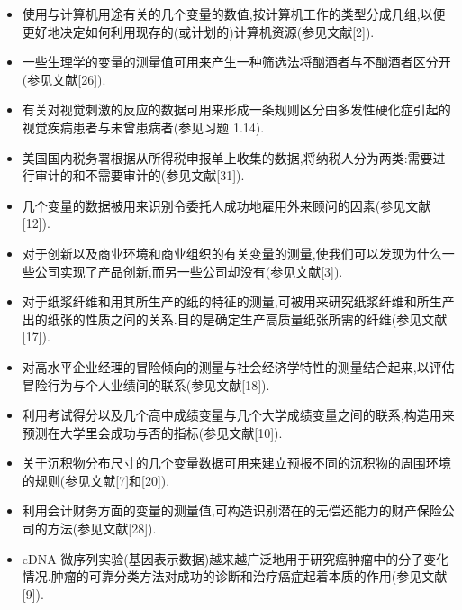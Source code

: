 
\begin{itemize}[leftmargin=*,itemsep=2pt]
\item 使用与计算机用途有关的几个变量的数值,按计算机工作的类型分成几组,以便更好地决定如何利用现存的(或计划的)计算机资源(参见文献[2]).
\item 一些生理学的变量的测量值可用来产生一种筛选法将酗酒者与不酗酒者区分开(参见文献[26]).
\item 有关对视觉刺激的反应的数据可用来形成一条规则区分由多发性硬化症引起的视觉疾病患者与未曾患病者(参见习题 1.14).
\item 美国国内税务署根据从所得税申报单上收集的数据,将纳税人分为两类:需要进行审计的和不需要审计的(参见文献[31]).
\end{itemize}


\begin{itemize}[leftmargin=*,itemsep=2pt]
\item 几个变量的数据被用来识别令委托人成功地雇用外来顾问的因素(参见文献[12]).
\item 对于创新以及商业环境和商业组织的有关变量的测量,使我们可以发现为什么一些公司实现了产品创新,而另一些公司却没有(参见文献[3]).
\item 对于纸浆纤维和用其所生产的纸的特征的测量,可被用来研究纸浆纤维和所生产出的纸张的性质之间的关系.目的是确定生产高质量纸张所需的纤维(参见文献[17]).
\item 对高水平企业经理的冒险倾向的测量与社会经济学特性的测量结合起来,以评估冒险行为与个人业绩间的联系(参见文献[18]).
\end{itemize}


\begin{itemize}[leftmargin=*,itemsep=2pt]
\item 利用考试得分以及几个高中成绩变量与几个大学成绩变量之间的联系,构造用来预测在大学里会成功与否的指标(参见文献[10]).
\item 关于沉积物分布尺寸的几个变量数据可用来建立预报不同的沉积物的周围环境的规则(参见文献[7]和[20]).
\item 利用会计财务方面的变量的测量值,可构造识别潜在的无偿还能力的财产保险公司的方法(参见文献[28]).
\item cDNA 微序列实验(基因表示数据)越来越广泛地用于研究癌肿瘤中的分子变化情况.肿瘤的可靠分类方法对成功的诊断和治疗癌症起着本质的作用(参见文献[9]).
\end{itemize}

